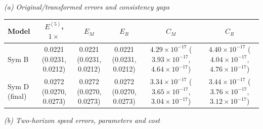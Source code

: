 {\small\textit{(a) Original/transformed errors and consistency gaps}}\par\vspace{2pt}
\par\begingroup\centering\fontsize{8.5}{10.5}\selectfont\setlength{\parskip}{0pt}\setlength{\tabcolsep}{4pt}
\begin{tabular}{@{}lccccc@{}}
\toprule
Model & $E^{(5)}$, $1\times$ & $E_M$ & $E_R$ & $C_M$ & $C_R$ \\
\midrule
Sym B & \shortstack{0.0221\\[-1pt](0.0231, 0.0212)} & \shortstack{0.0221\\[-1pt](0.0231, 0.0212)} & \shortstack{0.0221\\[-1pt](0.0231, 0.0212)} & \shortstack{$4.29\!\times\!10^{-17}$\\[-1pt]($3.93\!\times\!10^{-17}$, $4.64\!\times\!10^{-17}$)} & \shortstack{$4.40\!\times\!10^{-17}$\\[-1pt]($4.04\!\times\!10^{-17}$, $4.76\!\times\!10^{-17}$)} \\
Sym D (final) & \shortstack{0.0272\\[-1pt](0.0270, 0.0273)} & \shortstack{0.0272\\[-1pt](0.0270, 0.0273)} & \shortstack{0.0272\\[-1pt](0.0270, 0.0273)} & \shortstack{$3.34\!\times\!10^{-17}$\\[-1pt]($3.65\!\times\!10^{-17}$, $3.04\!\times\!10^{-17}$)} & \shortstack{$3.44\!\times\!10^{-17}$\\[-1pt]($3.76\!\times\!10^{-17}$, $3.12\!\times\!10^{-17}$)} \\
\bottomrule
\end{tabular}\par\endgroup\vspace{5pt}
{\small\textit{(b) Two-horizon speed errors, parameters and cost}}\par\vspace{2pt}
\par\begingroup\centering\fontsize{8.5}{10.5}\selectfont\setlength{\parskip}{0pt}\setlength{\tabcolsep}{4pt}
